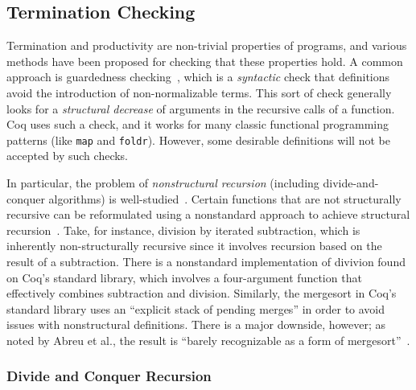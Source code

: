 \documentclass[ a4paper, UKenglish, cleveref, autoref, thm-restate]{lipics-v2021}
\newcommand{\mvol}[1]{\textcolor{blue}{\textsc{Michael}: #1}}
\newcommand{\haskell}[1]{\texttt{#1}}
\begin{document}

\subsection{Termination Checking}\label{sec:termcheck}

Termination and productivity are non-trivial properties of programs, and various
methods have been proposed for checking that these properties hold. A common
approach is guardedness checking~\cite{10.5555/646535.695850}, which is a
\emph{syntactic} check that definitions avoid the introduction of
non-normalizable terms. This sort of check generally looks for a
\emph{structural decrease} of arguments in the recursive calls of a function.
Coq uses such a check, and it works for many classic functional programming
patterns (like \haskell{map} and \haskell{foldr}). However, some desirable
definitions will not be accepted by such checks.

In particular, the problem of \emph{nonstructural recursion} (including
divide-and-conquer algorithms) is well-studied~\cite{BOVE_KRAUSS_SOZEAU_2016}.
Certain functions that are not structurally recursive can be reformulated using
a nonstandard approach to achieve structural recursion~\cite{AbreuDHJMS23}.
Take, for instance, division by iterated subtraction, which is inherently
non-structurally recursive since it involves recursion based on the result of a
subtraction. There is a nonstandard implementation of divivion found on Coq's
standard library, which involves a four-argument function that effectively
combines subtraction and division. Similarly, the mergesort in Coq's standard
library uses an ``explicit stack of pending merges'' in order to avoid issues
with nonstructural definitions. There is a major downside, however; as noted by
Abreu et al., the result is ``barely recognizable as a form of
mergesort''~\cite{AbreuDHJMS23}.
 
\subsubsection{Divide and Conquer Recursion}\label{sec:reccoq}
\end{document}
